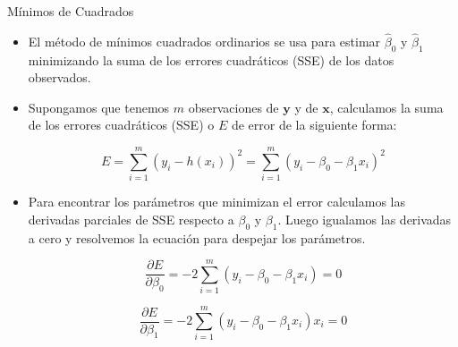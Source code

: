 \documentclass[handout]{beamer}
\begin{document}
\begin{frame}{Mínimos de Cuadrados}
\scriptsize{
\begin{itemize}

 \item El método de mínimos cuadrados ordinarios  se usa para estimar $\hat{\beta}_{0}$ y $\hat{\beta}_{1}$ minimizando la suma de los errores cuadráticos (SSE) de los datos observados.

 \item Supongamos que tenemos $m$ observaciones de $\mathbf{y}$ y de $\mathbf{x}$,  calculamos la suma de los errores cuadráticos (SSE) o $E$ de error de la siguiente forma:

\begin{equation}
E = \sum_{i=1}^{m} (y_i-h(x_i))^2 =  \sum_{i=1}^{m} (y_i-\beta_{0}-\beta_{1}x_i)^2
\end{equation}

 \item Para encontrar los parámetros que minimizan el error calculamos las derivadas parciales de SSE respecto a $\beta_{0}$ y $\beta_{1}$. Luego igualamos las derivadas a cero y resolvemos la ecuación para despejar los parámetros.
 
 \begin{equation}
 \frac{\partial E}{ \partial \beta_0} = -2\sum_{i=1}^{m}(y_i-\beta_{0}-\beta_{1}x_i)=0
 \end{equation}

  \begin{equation}
 \frac{\partial E}{ \partial \beta_1} = -2\sum_{i=1}^{m}(y_i-\beta_{0}-\beta_{1}x_i)x_i=0
 \end{equation}



\end{itemize}



} 
\end{frame}
\end{document}
